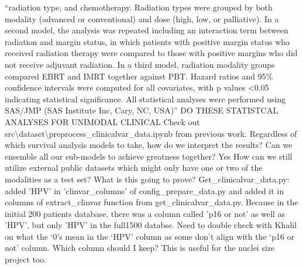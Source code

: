 \documentclass{article}%
\begin{document}
\newline%
\newline%
%
“radiation type, and chemotherapy. Radiation types were grouped by both modality (advanced or conventional) and dose (high, low, or palliative). In a second model, the analysis was repeated including an interaction term between radiation and margin status, in which patients with positive margin status who received radiation therapy were compared to those with positive margins who did not receive adjuvant radiation. In a third model, radiation modality groups compared EBRT and IMRT together against PBT. Hazard ratios and 95\% confidence intervals were computed for all covariates, with p values <0.05 indicating statistical significance. All statistical analyses were performed using SAS/JMP (SAS Institute Inc, Cary, NC, USA)”%
\newline%
\newline%
%
DO THESE STATISTCAL ANALYSES FOR UNIMODAL CLINICAL%
\newline%
\newline%
%
Check out src\textbackslash{}dataset\textbackslash{}preprocess\_clinicalvar\_data.ipynb from previous work. %
\newline%
\newline%
%
%
\newline%
\newline%
%
Regardless of which survival analysis models to take, how do we interpret the results? %
\newline%
\newline%
%
Can we ensemble all our sub{-}models to achieve greatness together? %
\newline%
\newline%
%
Yes%
\newline%
\newline%
%
How can we still utilize external public datasets which might only have one or two of the modalities as a test set? What is this going to prove? %
\newline%
\newline%
%
Get\_clinicalvar\_data.py: added 'HPV' in 'clinvar\_columns' of config\_prepare\_data.py and added it in columns of extract\_clinvar function from get\_clinicalvar\_data.py. Because in the initial 200 patients database, there was a column called 'p16 or not' as well as 'HPV', but only 'HPV' in the full1500 databse. %
\newline%
\newline%
%
Need to double check with Khalil on what the ‘0’s mean in the ‘HPV’ column as some don’t align with the ‘p16 or not’ column. Which column should I keep? This is useful for the nuclei size project too.%
\end{document}
